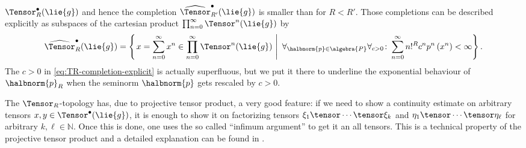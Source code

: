 \documentclass[
11pt,                          %
english                        %
]{article}
\begin{document}
$\Tensor_R^{\bullet}(\lie{g})$ and hence the completion 
$\widehat{\Tensor}_{R'}^{\bullet}(\lie{g})$ is smaller than for $R < R'$.
Those completions can be described explicitly as subspaces of the cartesian product 
$\prod_{n=0}^\infty \Tensor^n(\lie{g})$ by
\begin{equation}
	\label{eq:TR-completion-explicit}
	\widehat{\Tensor}_R^{\bullet}(\lie{g})
	=
	\left\{
	\left.
		x
		=
		\sum\limits_{n = 0}^\infty
		x^n
		\in
		\prod_{n=0}^\infty \Tensor^n(\lie{g})
	\ \right| \ 
		\forall_{\halbnorm{p} \in \algebra{P}}
		\forall_{c > 0}
		\colon
		\sum\limits_{n = 0}^\infty
		n!^R c^n p^n \left( x^n \right)
		<
		\infty
	\right\}.
\end{equation}
The $c > 0$ in \eqref{eq:TR-completion-explicit} is actually superfluous, but we put 
it there to underline the exponential behaviour of $\halbnorm{p}_R$ when the seminorm 
$\halbnorm{p}$ gets rescaled by $c > 0$.

The $\Tensor_R$-topology has, due to projective tensor product, a 
very good feature: if we need to show a continuity estimate on arbitrary tensors 
$x,y \in \Tensor^{\bullet}(\lie{g})$, it is enough to show it on factorizing tensors 
$\xi_1 \tensor \cdots \tensor \xi_k$ and $\eta_1 \tensor \cdots \tensor \eta_\ell$ 
for arbitrary $k, \ell \in \mathbb{N}$. Once this is done, one uses the so called 
``infimum argument'' to get it an all tensors. This is a technical property of the 
projective tensor product and a detailed explanation can be found in
\cite[Proposition 3.2]{esposito.stapor.waldmann:2015a:pre}.
\end{document}
